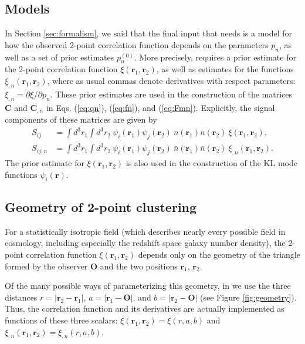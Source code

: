 \documentclass{article}
\newcommand{\opsec}{\protect{\textrm{OPSEC}}\xspace}
\renewcommand{\vec}[1]{\bm{#1}}
\newcommand{\mat}[1]{\mathbf{#1}}
\renewcommand{\r}{\vec{r}}
\begin{document}
\subsection{Models}

In Section \ref{sec:formalism}, we said that the final input that \opsec needs
is a model for how the observed 2-point correlation function depends on the
parameters $p_n$, as well as a set of prior estimates $p_n^{(0)}$.  More
precisely, \opsec requires a prior estimate for the 2-point correlation
function $\xi(\r_1,\r_2)$, as well as estimates for the functions
$\xi_{,n}(\r_1,\r_2)$, where as usual commas denote derivatives with respect
parameters: $\xi_{,n} = \partial \xi/\partial p_n$.  These prior estimates are
used in the construction of the matrices $\mat{C}$ and $\mat{C}_{,n}$ in
Eqs. (\ref{eq:qn}), (\ref{eq:fn}), and (\ref{eq:Fmn}).  Explicitly, the signal
components of these matrices are given by
\begin{align}
    S_{ij} &= \int d^3r_1 \int d^3r_2~ \psi_i(\r_1) \psi_j(\r_2)~ \bar{n}(\r_1) \bar{n}(\r_2)~ \xi(\r_1,\r_2), \\
    S_{ij,n} &= \int d^3r_1 \int d^3r_2~ \psi_i(\r_1) \psi_j(\r_2)~ \bar{n}(\r_1) \bar{n}(\r_2)~ \xi_{,n}(\r_1,\r_2).
\end{align}
The prior estimate for $\xi(\r_1,\r_2)$ is also used in the construction of the
KL mode functions $\psi_i(\r)$.


\subsection{Geometry of 2-point clustering}

For a statistically isotropic field (which describes nearly every possible
field in cosmology, including especially the redshift space galaxy number
density), the 2-point correlation function $\xi(\r_1,\r_2)$ depends only on
the geometry of the triangle formed by the observer $\vec{O}$ and the two
positions $\r_1$, $\r_2$.

Of the many possible ways of parameterizing this geometry, in \opsec we use the
three distances $r = |\r_2-\r_1|$, $a = |\r_1-\vec{O}|$, and $b=|\r_2-\vec{O}|$
(see Figure \ref{fig:geometry}).  Thus, the correlation function and its
derivatives are actually implemented as functions of these three scalars:
$\xi(\r_1,\r_2) = \xi(r,a,b)$ and $\xi_{,n}(\r_1,\r_2) = \xi_{,n}(r,a,b)$.

\begin{figure}

\end{figure}
\end{document}
